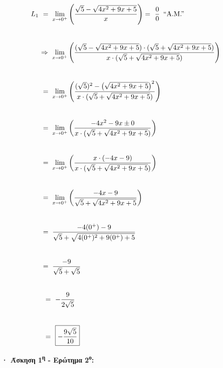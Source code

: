 \documentclass{article}
\begin{document}
\begin{align*}
    L_1 \hspace{0.125cm} & = \hspace{0.1cm} \lim_{x \to 0^+} \left( \frac{\sqrt{5} - \sqrt{4x^2 + 9x + 5}}{x} \right) = \hspace{0.125cm} \frac{0}{0} \hspace{0.175cm} \text{“A.M.”} \\[5ex]
    & \mathbf{\Rightarrow} \hspace{0.15cm} \lim_{x \to 0^+} \left( \frac{(\sqrt{5} - \sqrt{4x^2 + 9x + 5}) \cdot (\sqrt{5} + \sqrt{4x^2 + 9x + 5})}{x \cdot (\sqrt{5} + \sqrt{4x^2 + 9x + 5})} \right) \\[5ex]
    & = \hspace{0.1cm} \lim_{x \to 0^+} \left( \frac{(\sqrt{5})^2 - \left(\sqrt{4x^2 + 9x + 5}\right)^2}{x \cdot (\sqrt{5} + \sqrt{4x^2 + 9x + 5})} \right) \\[5ex]
    & = \hspace{0.1cm} \lim_{x \to 0^+} \left( \frac{-4x^2 - 9x \pm 0}{x \cdot (\sqrt{5} + \sqrt{4x^2 + 9x + 5})} \right) \\[5ex]
    & = \hspace{0.1cm} \lim_{x \to 0^+} \left( \frac{x \cdot (-4x - 9)}{x \cdot (\sqrt{5} + \sqrt{4x^2 + 9x + 5})} \right) \\[5ex]
    & = \hspace{0.1cm} \lim_{x \to 0^+} \left( \frac{-4x - 9}{\sqrt{5} + \sqrt{4x^2 + 9x + 5}} \right) \\[5ex]
    & = \hspace{0.1cm} \frac{-4(0^+) - 9}{\sqrt{5} + \sqrt{4 (0^+)^2 + 9 (0^+) + 5}} \\[5ex]
    & = \hspace{0.1cm} \frac{-9}{\sqrt{5} + \sqrt{5}} \\[5ex]
    & \hspace{0.125cm} = \hspace{0.125cm} - \frac{9}{2\sqrt{5}} \\[5ex]
    & \hspace{0.125cm} = \hspace{0.125cm} \boxed{-\frac{9\sqrt{5}}{10}}
\end{align*}


\newpage

\noindent \textbf{· Άσκηση 1\textsuperscript{η} - Ερώτημα 2\textsuperscript{ο}:} \hfill
\end{document}
